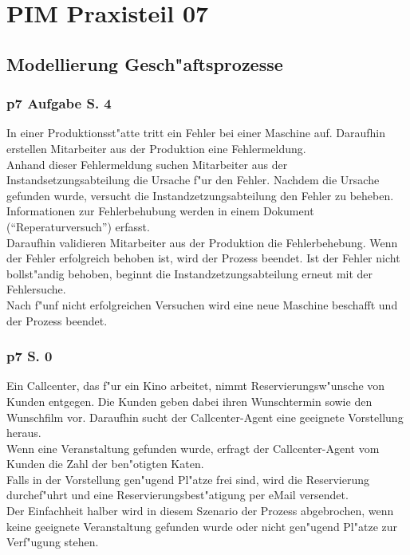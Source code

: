 
\chapter{PIM Praxisteil 07}

\section{Modellierung Gesch"aftsprozesse}

\subsection{p7 Aufgabe S. 4}

In einer Produktionsst"atte tritt ein Fehler bei einer Maschine auf.
Daraufhin erstellen Mitarbeiter aus der Produktion eine Fehlermeldung.\\
Anhand dieser Fehlermeldung suchen Mitarbeiter aus der Instandsetzungsabteilung die Ursache f"ur den Fehler.
Nachdem die Ursache gefunden wurde, versucht die Instandzetzungsabteilung den Fehler zu beheben.
Informationen zur Fehlerbehubung werden in einem Dokument ("`Reperaturversuch"') erfasst.\\
Daraufhin validieren Mitarbeiter aus der Produktion die Fehlerbehebung.
Wenn der Fehler erfolgreich behoben ist, wird der Prozess beendet.
Ist der Fehler nicht bollst"andig behoben, beginnt die Instandzetzungsabteilung erneut mit der Fehlersuche.\\
Nach f"unf nicht erfolgreichen Versuchen wird eine neue Maschine beschafft und der Prozess beendet.\\



\subsection{p7 S. 0}

Ein Callcenter, das f"ur ein Kino arbeitet, nimmt Reservierungsw"unsche von Kunden entgegen.
Die Kunden geben dabei ihren Wunschtermin sowie den Wunschfilm vor.
Daraufhin sucht der Callcenter-Agent eine geeignete Vorstellung heraus.\\
Wenn eine Veranstaltung gefunden wurde, erfragt der Callcenter-Agent vom Kunden die Zahl der ben"otigten Katen.\\
Falls in der Vorstellung gen"ugend Pl"atze frei sind, wird die Reservierung durchef"uhrt und eine Reservierungsbest"atigung per eMail versendet.\\
Der Einfachheit halber wird in diesem Szenario der Prozess abgebrochen, wenn keine geeignete Veranstaltung gefunden wurde oder nicht gen"ugend Pl"atze zur Verf"ugung stehen.\\


